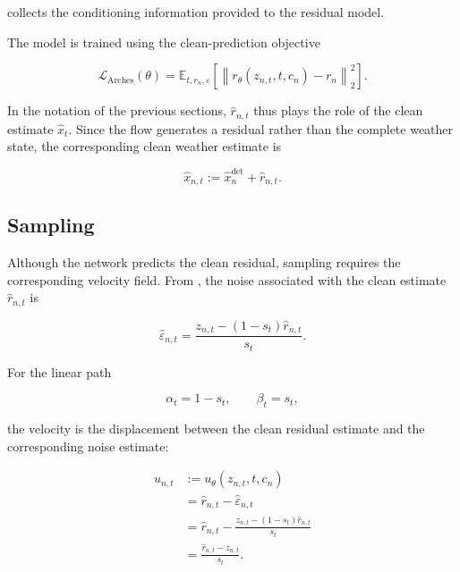 collects the conditioning information provided to the residual model.

The model is trained using the clean-prediction objective

\begin{equation}
    \mathcal{L}_{\mathrm{Arches}}(\theta)
    =
    \mathbb{E}_{t,r_n,\varepsilon}
    \left[
        \left\|
            r_\theta(z_{n,t},t,c_n)
            -
            r_n
        \right\|_2^2
    \right].
    \label{eq:arches-training-objective}
\end{equation}

In the notation of the previous sections, $\hat{r}_{n,t}$ thus plays the role
of the clean estimate $\hat{x}_t$.
Since the flow generates a residual rather than the complete weather state,
the corresponding clean weather estimate is

\begin{equation}
    \hat{x}_{n,t}
    :=
    \hat{x}^{\mathrm{det}}_n
    +
    \hat{r}_{n,t}.
    \label{eq:arches-clean-state}
\end{equation}

\subsection{Sampling}

Although the network predicts the clean residual, sampling requires the
corresponding velocity field.
From , the noise associated with the clean
estimate $\hat r_{n,t}$ is

\begin{equation}
    \hat{\varepsilon}_{n,t}
    =
    \frac{
        z_{n,t}
        -
        (1-s_t)\hat r_{n,t}
    }{
        s_t
    }.
    \label{eq:arches-noise-estimate}
\end{equation}

For the linear path

\[
    \alpha_t=1-s_t,
    \qquad
    \beta_t=s_t,
\]

the velocity is the displacement between the clean residual estimate and the
corresponding noise estimate:

\begin{align}
    u_{n,t}
    &:=
    u_\theta(z_{n,t},t,c_n)
    \\
    &=
    \hat r_{n,t}
    -
    \hat{\varepsilon}_{n,t}
    \\
    &=
    \hat r_{n,t}
    -
    \frac{
        z_{n,t}
        -
        (1-s_t)\hat r_{n,t}
    }{
        s_t
    }
    \\
    &=
    \frac{
        \hat r_{n,t}
        -
        z_{n,t}
    }{
        s_t
    }.
    \label{eq:arches-velocity}
\end{align}

